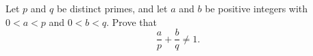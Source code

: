Let $p$ and $q$ be distinct primes, and let $a$ and $b$ be positive integers with $0<a<p$ and $0<b<q$. Prove that
\[
\dfrac{a}{p}+\dfrac{b}{q}\ne 1 .
\]

